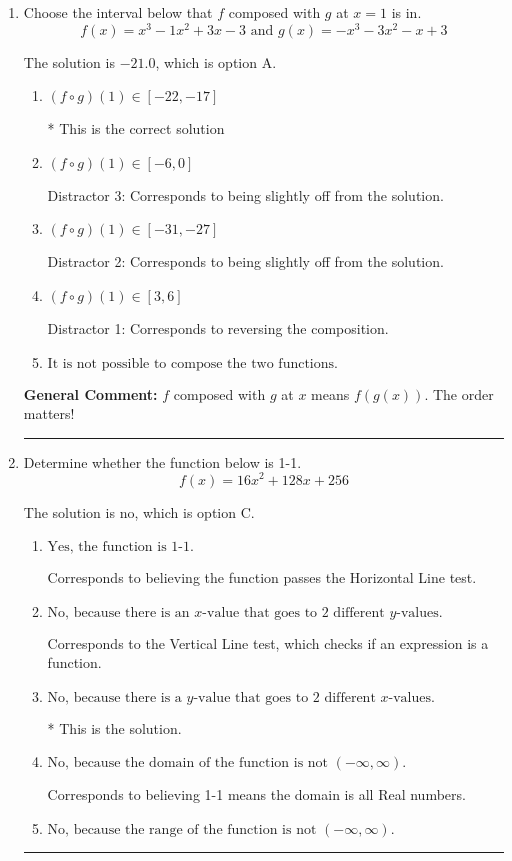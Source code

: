 \documentclass{extbook}[14pt]
\newcommand{\litem}[1]{\item #1

\rule{\textwidth}{0.4pt}}
\begin{document}
\begin{enumerate}\litem{
Choose the interval below that $f$ composed with $g$ at $x=1$ is in.
\[ f(x) = x^{3} -1 x^{2} +3 x -3 \text{ and } g(x) = -x^{3} -3 x^{2} -x + 3 \]

The solution is \( -21.0 \), which is option A.\begin{enumerate}[label=\Alph*.]
\item \( (f \circ g)(1) \in [-22, -17] \)

* This is the correct solution
\item \( (f \circ g)(1) \in [-6, 0] \)

 Distractor 3: Corresponds to being slightly off from the solution.
\item \( (f \circ g)(1) \in [-31, -27] \)

 Distractor 2: Corresponds to being slightly off from the solution.
\item \( (f \circ g)(1) \in [3, 6] \)

 Distractor 1: Corresponds to reversing the composition.
\item \( \text{It is not possible to compose the two functions.} \)


\end{enumerate}

\textbf{General Comment:} $f$ composed with $g$ at $x$ means $f(g(x))$. The order matters!
}
\litem{
Determine whether the function below is 1-1.
\[ f(x) = 16 x^2 + 128 x + 256 \]

The solution is \( \text{no} \), which is option C.\begin{enumerate}[label=\Alph*.]
\item \( \text{Yes, the function is 1-1.} \)

Corresponds to believing the function passes the Horizontal Line test.
\item \( \text{No, because there is an $x$-value that goes to 2 different $y$-values.} \)

Corresponds to the Vertical Line test, which checks if an expression is a function.
\item \( \text{No, because there is a $y$-value that goes to 2 different $x$-values.} \)

* This is the solution.
\item \( \text{No, because the domain of the function is not $(-\infty, \infty)$.} \)

Corresponds to believing 1-1 means the domain is all Real numbers.
\item \( \text{No, because the range of the function is not $(-\infty, \infty)$.} \)


\end{enumerate}}
\end{enumerate}
\end{document}
